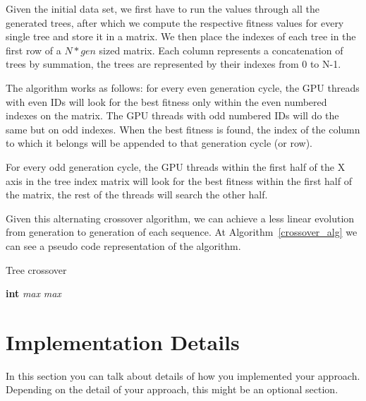 \documentclass[runningheads]{llncs}
\begin{document}
Given the initial data set, we first have to run the values through all the generated trees, after which we compute the respective fitness values for every single tree and store it in a matrix. We then place the indexes of each tree in the first row of a $N * gen$ sized matrix. Each column represents a concatenation of trees by summation, the trees are represented by their indexes from 0 to N-1.

The algorithm works as follows: for every even generation cycle, the GPU threads with even IDs will look for the best fitness only within the even numbered indexes on the matrix. The GPU threads with odd numbered IDs will do the same but on odd indexes. When the best fitness is found, the index of the column to which it belongs will be appended to that generation cycle (or row).

For every odd generation cycle, the GPU threads within the first half of the X axis in the tree index matrix will look for the best fitness within the first half of the matrix, the rest of the threads will search the other half.

Given this alternating crossover algorithm, we can achieve a less linear evolution from generation to generation of each sequence. At Algorithm~\ref{crossover_alg} we can see a pseudo code representation of the algorithm.

\begin{algorithm} \label{crossover_alg}
\caption{Tree crossover}
\begin{algorithmic}[1]
\State \textbf{int} \textit{max}
	\EndFor
\Else {}
	\EndFor
\Else
	\EndFor
\EndIf
\EndIf
\State \Return \textit{max}
\EndProcedure
\end{algorithmic}
\end{algorithm}


\section{Implementation Details}

In this section you can talk about details of how you implemented your approach. Depending on the detail of your approach, this might be an optional section.
\end{document}

